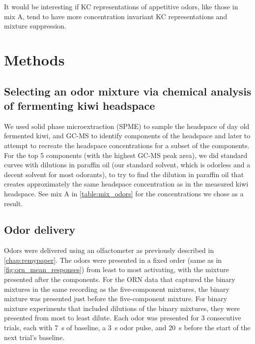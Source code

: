 \documentclass[12pt]{caltech_thesis}
\let\Oldsection\section
\renewcommand{\section}{\FloatBarrier\Oldsection}
\let\Oldsubsection\subsection
\renewcommand{\subsection}{\FloatBarrier\Oldsubsection}
\begin{document}
\begin{refsection}
It would be interesting if KC representations of appetitive odors, like those in mix A, tend to have more concentration invariant KC representations and mixture suppression.
\fi

\processdelayedfloats

\section{Methods}

\subsection{Selecting an odor mixture via chemical analysis of fermenting kiwi headspace}
We used solid phase microextraction (SPME) to sample the headspace of day old fermented kiwi, and GC-MS to identify components of the headspace and later to attempt to recreate the headspace concentrations for a subset of the components.
For the top 5 components (with the highest GC-MS peak area), we did standard curves with dilutions in paraffin oil (our standard solvent, which is odorless and a decent solvent for most odorants), to try to find the dilution in paraffin oil that creates approximately the same headspace concentration as in the measured kiwi headspace.
See mix A in \cref{table:mix_odors} for the concentrations we chose as a result.

\subsection{Odor delivery}
Odors were delivered using an olfactometer as previously described in \autoref{chap:remypaper}.
The odors were presented in a fixed order (same as in \cref{fig:orn_mean_responses}) from least to most activating, with the mixture presented after the components.
For the ORN data that captured the binary mixtures in the same recording as the five-component mixtures, the binary mixture was presented just before the five-component mixture.
For binary mixture experiments that included dilutions of the binary mixtures, they were presented from most to least dilute.
Each odor was presented for 3 consecutive trials, each with \qty{7}{\second} of baseline, a \qty{3}{\second} odor pulse, and \qty{20}{\second} before the start of the next trial's baseline.


\end{refsection}
\end{document}
